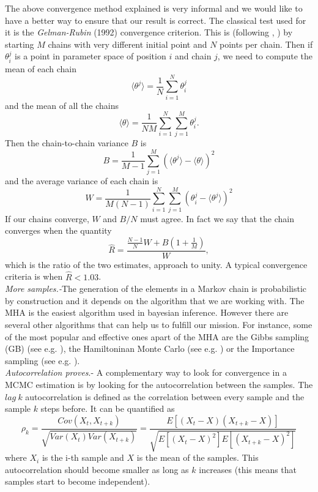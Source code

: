 \documentclass[onecolumn,           %
               showpacs,            %
               preprintnumbers,     %
               aps,                 %
               prl,          	    %
               letterpaper,             %
               superscriptaddress,      %
               nofootinbib,         %
               tightenlines,        %
               floats,floatfix      %
               ,usenatbib,
               ]{revtex4-1}
\begin{document}
The above convergence method explained is very informal and we would like to have a better way to ensure that our result is correct. The classical test used for it is the \textit{Gelman-Rubin} (1992) convergence criterion. This is (following \cite{LicV2}, \cite{AlanH}) by starting $M$ chains with very different initial point and $N$ points per chain. Then if $\theta_i^j$ is a point in parameter space of position $i$ and chain $j$, we need to compute the mean of each chain 
\begin{equation}
\langle\theta^j\rangle =\frac{1}{N}\sum_{i=1}^N \theta_i^j
\end{equation}
and the mean of all the chains
\begin{equation}
\langle\theta\rangle =\frac{1}{NM}\sum_{i=1}^N\sum_{j=1}^M\theta_i^j.
\end{equation}
Then the chain-to-chain variance $B$ is
\begin{equation}
B=\frac{1}{M-1}\sum_{j=1}^M(\langle\theta^j\rangle-\langle\theta\rangle)^2
\end{equation}
and the average variance of each chain is
\begin{equation}
W=\frac{1}{M(N-1)}\sum_{i=1}^N\sum_{j=1}^M(\theta_i^j-\langle\theta^j\rangle)^2
\end{equation}
If our chains converge, $W$ and $B/N$ must agree. In fact we say that the chain converges when the quantity
\begin{equation}
\hat R=\frac{\frac{N-1}{N}W+B(1+\frac{1}{M})}{W},
\end{equation}
which is the ratio of the two estimates, approach to unity. A typical convergence criteria is when $\hat R<1.03$. 
\\

\textit{More samples.-}The generation of the elements in a Markov chain is probabilistic by construction and it depends on the algorithm that we are working with. The MHA is the easiest algorithm used in bayesian inference. However there are several other algorithms that can help us to fulfill our mission. For instance, some of the most popular and effective ones apart of the MHA are the Gibbs sampling (GB) (see e.g. \cite{gibbs1,gibbs2}), the Hamiltoninan Monte Carlo (see e.g. \cite{hamiltonian1,Hamiltonian2}) or the Importance sampling (see e.g. \cite{importance}).\\

\textit{Autocorrelation proves}.- A complementary way to look for convergence in a MCMC estimation is by looking for the autocorrelation between the samples. The $lag\ k$ autocorrelation is defined as the correlation between every sample and the sample $k$ steps before. It can be quantified as \cite{autocor}
\begin{equation}
\rho_k=\frac{Cov(X_t,X_{t+k})}{\sqrt{Var(X_t)Var(X_{t+k})}}=\frac{E[(X_t-X)(X_{t+k}-X)]}{\sqrt{E[(X_t-X)^2]E[(X_{t+k}-X)^2]}}
\end{equation}
where $X_i$ is the i-th sample and $X$ is the mean of the samples. This autocorrelation should become smaller as long as $k$ increases (this means that samples start to become independent).\\
 
\end{document}

